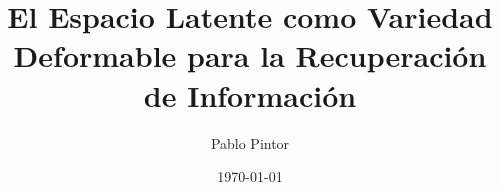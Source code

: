 \documentclass[12pt, a4paper]{article}
\title{El Espacio Latente como Variedad Deformable para la Recuperación de Información}
\author{Pablo Pintor}
\date{\today}
\begin{document}
\maketitle

\begin{abstract}
    
\end{abstract}

\tableofcontents
\newpage











\appendix

\end{document}
